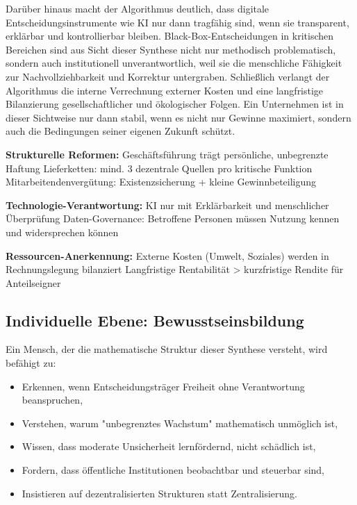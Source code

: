 \documentclass[a4paper, 12pt, twoside, openright]{report}
\theoremstyle{definition}
\theoremstyle{definition}
\begin{document}
Darüber hinaus macht der Algorithmus deutlich, dass digitale Entscheidungsinstrumente wie KI nur dann tragfähig sind, wenn sie transparent, erklärbar und kontrollierbar bleiben. Black-Box-Entscheidungen in kritischen Bereichen sind aus Sicht dieser Synthese nicht nur methodisch problematisch, sondern auch institutionell unverantwortlich, weil sie die menschliche Fähigkeit zur Nachvollziehbarkeit und Korrektur untergraben. Schließlich verlangt der Algorithmus die interne Verrechnung externer Kosten und eine langfristige Bilanzierung gesellschaftlicher und ökologischer Folgen. Ein Unternehmen ist in dieser Sichtweise nur dann stabil, wenn es nicht nur Gewinne maximiert, sondern auch die Bedingungen seiner eigenen Zukunft schützt.

\begin{algorithm}
\caption{Nachhaltige Unternehmensgovernance}
\label{alg:nachhaltige-unternehmensgovernence}
\begin{algorithmic}[1]
\item[] \textbf{Strukturelle Reformen:}
\State Geschäftsführung trägt persönliche, unbegrenzte Haftung
\State Lieferketten: mind. 3 dezentrale Quellen pro kritische Funktion
\State Mitarbeitendenvergütung: Existenzsicherung + kleine Gewinnbeteiligung

\item[] \textbf{Technologie-Verantwortung:}
\State KI nur mit Erklärbarkeit und menschlicher Überprüfung
\State Daten-Governance: Betroffene Personen müssen Nutzung kennen und widersprechen können

\item[] \textbf{Ressourcen-Anerkennung:}
\State Externe Kosten (Umwelt, Soziales) werden in Rechnungslegung bilanziert
\State Langfristige Rentabilität > kurzfristige Rendite für Anteilseigner
\end{algorithmic}
\end{algorithm}

\subsection{Individuelle Ebene: Bewusstseinsbildung}

Ein Mensch, der die mathematische Struktur dieser Synthese versteht, wird befähigt zu:
\begin{itemize}
\item Erkennen, wenn Entscheidungsträger Freiheit ohne Verantwortung beanspruchen,
\item Verstehen, warum "unbegrenztes Wachstum" mathematisch unmöglich ist,
\item Wissen, dass moderate Unsicherheit lernfördernd, nicht schädlich ist,
\item Fordern, dass öffentliche Institutionen beobachtbar und steuerbar sind,
\item Insistieren auf dezentralisierten Strukturen statt Zentralisierung.
\end{itemize}
\end{document}
